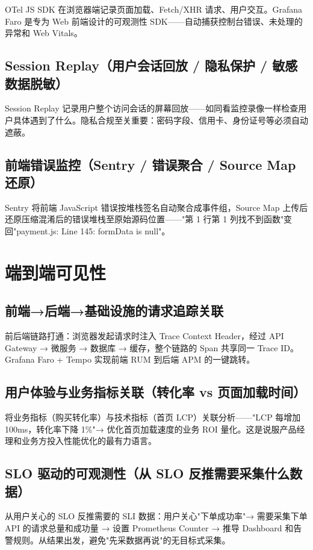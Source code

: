 \documentclass[12pt,UTF8]{ctexbook}
\begin{document}
OTel JS SDK 在浏览器端记录页面加载、Fetch/XHR 请求、用户交互。Grafana Faro 是专为 Web 前端设计的可观测性 SDK——自动捕获控制台错误、未处理的异常和 Web Vitals。

    \subsection{Session Replay（用户会话回放 / 隐私保护 / 敏感数据脱敏）}

Session Replay 记录用户整个访问会话的屏幕回放——如同看监控录像一样检查用户具体遇到了什么。隐私合规至关重要：密码字段、信用卡、身份证号等必须自动遮蔽。

    \subsection{前端错误监控（Sentry / 错误聚合 / Source Map 还原）}

Sentry 将前端 JavaScript 错误按堆栈签名自动聚合成事件组，Source Map 上传后还原压缩混淆后的错误堆栈至原始源码位置——"第 1 行第 1 列找不到函数"变回"payment.js: Line 145: formData is null"。

  \section{端到端可见性}
    \subsection{前端→后端→基础设施的请求追踪关联}

前后端链路打通：浏览器发起请求时注入 Trace Context Header，经过 API Gateway → 微服务 → 数据库 → 缓存，整个链路的 Span 共享同一 Trace ID。Grafana Faro + Tempo 实现前端 RUM 到后端 APM 的一键跳转。

    \subsection{用户体验与业务指标关联（转化率 vs 页面加载时间）}

将业务指标（购买转化率）与技术指标（首页 LCP）关联分析——"LCP 每增加 100ms，转化率下降 1\%"→ 优化首页加载速度的业务 ROI 量化。这是说服产品经理和业务方投入性能优化的最有力语言。

    \subsection{SLO 驱动的可观测性（从 SLO 反推需要采集什么数据）}

从用户关心的 SLO 反推需要的 SLI 数据：用户关心"下单成功率"→ 需要采集下单 API 的请求总量和成功量 → 设置 Prometheus Counter → 推导 Dashboard 和告警规则。从结果出发，避免"先采数据再说"的无目标式采集。
\end{document}
